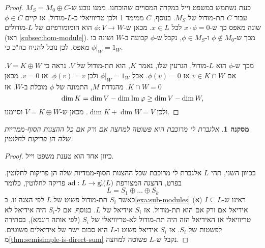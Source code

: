 \documentclass{report}
\theoremstyle{break}
\newtheorem{corollary}[corollary]{מסקנה}
\theoremstyle{MyNonumberbreak}
\newtheorem{proof}{הוכחה}
\DeclareMathOperator{\ad}{ad} %
\begin{document}
\begin{proof}
	כעת נשתמש במשפט וייל במקרה המסויים שהוכחנו. ממנו נובע ש-$M_S = M_0 \oplus C$ עבור $C$ תת-מודול של $M_S$. בנוסף, $C$ ממימד 1 ולכן טריוויאלי כ-$L$-מודול, אז קיים $\phi \in C$ שונה מאפס כך ש-$x \cdot \phi = 0$ לכל $x \in L$. מכאן ש-$\phi : V \to W$ הוא הומומורפיזם של $L$-מודולים (ראו \autoref*{subsec:hom-module}). מכך ש-$\phi \notin M_0$ ו-$\phi \in M_S$, נקבל ש-$\phi$ קבועה ב-$W$ ושונה בו מאפס, לכן נוכל להניח בה"כ כי $\phi|_W = 1_W$.
	
	מכך ש-$\phi$ הוא $L$-מודול, הגרעין שלו, נאמר $K$, הוא תת-מודול של $V$. נראה כי $V = K \oplus W$. אם $v \in K \cap W$ אז $\phi(v) = 0$. אבל $\phi|_W = 1_W$ ולכן $\phi(v) = v$. אז $v = 0$. מכאן $K \cap W = 0$. מהגדרת $M$, התמונה של $\phi$ מוכלת ב-$W$. אז
	\[ \dim K = \dim V - \dim\operatorname{Im}\varphi \ge \dim V - \dim W, \]
	ולכן $\dim K + \dim W = V$. מכאן ש-$V = K \oplus W$ וסיימנו.
\end{proof}
\begin{corollary}
	אלגברת לי מרוכבת היא פשוטה למחצה אם ורק אם כל ההצגות הסוף-ממדיות שלה הן פריקות לחלוטין.
\end{corollary}
\begin{proof}
	כיוון אחד הוא טענת משפט וייל.
	
	בכיוון השני, תהי $L$ אלגברת לי מרוכבת שכל ההצגות הסוף-ממדיות שלה הן פריקות לחלוטין. בפרט, ההצגה המצורפת $\ad : L \to \gl(L)$ פריקה לחלוטין, כלומר
	\[ L = S_1 \oplus \ldots \oplus S_k \]
	כאשר $S_i$ תת-מודול פשוט של $L$ לפי הצגה זו. ב\autoref*{exa:sub-modules} (א) ראינו ש-$I \subseteq L$ אידיאל אם ורק אם הוא תת-מודול. אז $S_i$ אידיאל של $L$. בנוסף, אם ל-$S_i$ היה אידיאל לא טריוויאלי אז האידיאל הזה היה תת-מודול לא-טריוויאלי של $S_i$ (לפי אותה דוגמא), בסתירה לפשטות של $S_i$. אז $S_i$ אידיאל פשוט ו-$L$ היא סכום ישר של אידיאלים פשוטים. מ\autoref*{thm:semisimple-is-direct-sum} נקבל ש-$L$ פשוטה למחצה.
\end{proof}
\end{document}
